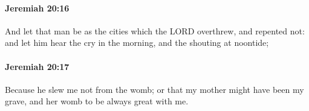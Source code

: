 		\paragraph{Jeremiah 20:16} %
			\label{JEREMIAH-20-16}

			And let that man be as the cities which the LORD overthrew, and repented not: and let him hear the cry in the morning, and the shouting at noontide;


		\paragraph{Jeremiah 20:17} %
			\label{JEREMIAH-20-17}

			Because he slew me not from the womb; or that my mother might have been my grave, and her womb to be always great with me.


